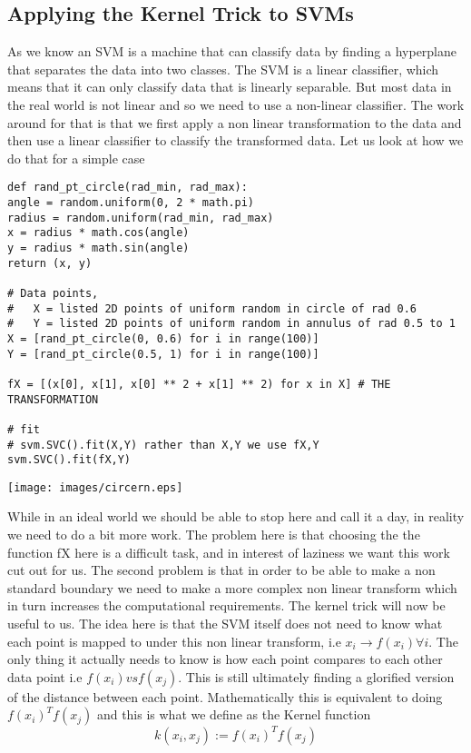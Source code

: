 \documentclass[hidelinks]{book}
\numberwithin{equation}{section}
\begin{document}
\subsection{Applying the Kernel Trick to SVMs}
As we know an SVM is a machine that can classify data by finding a
hyperplane that separates the data into two classes. The SVM is a linear
classifier, which means that it can only classify data that is linearly
separable. But most data in the real world is not linear and so we need to
use a non-linear classifier. The work around for that is that we first apply
a non linear transformation to the data and then use a linear classifier to
classify the transformed data.
Let us look at how we do that for a simple case
\begin{verbatim}
def rand_pt_circle(rad_min, rad_max):
angle = random.uniform(0, 2 * math.pi)
radius = random.uniform(rad_min, rad_max)
x = radius * math.cos(angle)
y = radius * math.sin(angle)
return (x, y)

# Data points,
#   X = listed 2D points of uniform random in circle of rad 0.6
#   Y = listed 2D points of uniform random in annulus of rad 0.5 to 1
X = [rand_pt_circle(0, 0.6) for i in range(100)]
Y = [rand_pt_circle(0.5, 1) for i in range(100)]

fX = [(x[0], x[1], x[0] ** 2 + x[1] ** 2) for x in X] # THE TRANSFORMATION

# fit
# svm.SVC().fit(X,Y) rather than X,Y we use fX,Y
svm.SVC().fit(fX,Y)
\end{verbatim}

\begin{center}
  \texttt{[image: images/circern.eps]}
\end{center}

While in an ideal world we should be able to stop here and call it a day, in
reality we need to do a bit more work. The problem here is that choosing the
the function fX here is a difficult task, and in interest of laziness we
want this work cut out for us. The second problem is that in order to be
able to make a non standard boundary we need to make a more complex non
linear transform which in turn increases the computational requirements. The
kernel trick will now be useful to us. The idea here is that the SVM itself
does not need to know what each point is mapped to under this non linear
transform, i.e $x_i \rightarrow f(x_i) \forall i$. The only thing it
actually needs to know is how each point compares to each other data point
i.e $f(x_i) vs f(x_j)$. This is still ultimately finding a glorified version
of the distance between each point. Mathematically this is equivalent to
doing $f(x_i)^T f(x_j)$ and this is what we define as the Kernel function
 $$k(x_i, x_j) := f(x_i)^T f(x_j) $$
\end{document}
